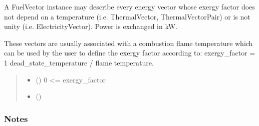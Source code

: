 \documentclass[letterpaper,10pt,english]{sphinxmanual}
\begin{document}
\begin{fulllineitems}
\label{\detokenize{generated/tamos.element.FuelVector:tamos.element.FuelVector}}
\pysigstartsignatures
{}
\pysigstopsignatures{}

\begin{fulllineitems}
\label{\detokenize{generated/tamos.element.FuelVector:tamos.element.FuelVector.__init__}}
\pysigstartsignatures
{}
\pysigstopsignatures
\sphinxAtStartPar
A FuelVector instance may describe every energy vector whose exergy factor does not depend on a temperature
(i.e. ThermalVector, ThermalVectorPair) or is not unity (i.e. ElectricityVector).
Power is exchanged in kW.

\sphinxAtStartPar
These vectors are usually associated with a combustion flame temperature which can be used by the user
to define the exergy factor according to:
exergy\_factor = 1 \sphinxhyphen{} dead\_state\_temperature / flame temperature.
\begin{quote}\begin{description}
\begin{itemize}
\item {} 
\sphinxAtStartPar
{} () \textendash{} 0 \textless{}= exergy\_factor

\item {} 
\sphinxAtStartPar
{} (\sphinxstyleliteralemphasis{\sphinxupquote{, }}) \textendash{} 

\end{itemize}

\end{description}\end{quote}
\subsubsection*{Notes}


\end{fulllineitems}
\end{fulllineitems}
\end{document}
